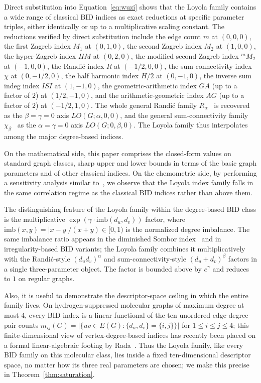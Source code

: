 \documentclass[a5paper, 10pt]{article}
\theoremstyle{plain}
\theoremstyle{remark}
\theoremstyle{definition}
\begin{document}
  Direct substitution into Equation~\eqref{eq:wuzi} shows that the
  Loyola family contains a wide range of classical BID indices as
  exact reductions at specific parameter triples, either
  identically or up to a multiplicative scaling constant. The reductions
  verified by direct substitution
  include the edge count $m$ at $(0, 0, 0)$, the first Zagreb
  index $M_1$ at $(0, 1, 0)$, the second Zagreb
  index $M_2$ at $(1, 0, 0)$, the hyper-Zagreb
  index $HM$ at $(0, 2, 0)$, the modified second Zagreb index
  ${}^{m}\!M_2$ at
  $(-1, 0, 0)$, the Randi\'c index $R$ at
  $(-1/2, 0, 0)$, the sum-connectivity index
  $\chi$ at $(0, -1/2, 0)$, the
  half harmonic index $H/2$ at
  $(0, -1, 0)$, the inverse sum indeg index
  $ISI$ at $(1, -1, 0)$, the
  geometric-arithmetic index
  $GA$ (up to a factor of $2$) at
  $(1/2, -1, 0)$, and the arithmetic-geometric index $AG$ (up to a
  factor of $2$) at $(-1/2, 1, 0)$. The whole general Randi\'c
  family $R_\alpha$~\cite{BollobasErdos1998} is recovered as the
  $\beta = \gamma = 0$ axis $LO(G; \alpha, 0, 0)$, and the general
  sum-connectivity family
  $\chi_\beta$~\cite{ZhouTrinajstic2009sumconn} as the
  $\alpha = \gamma = 0$ axis $LO(G; 0, \beta, 0)$. The Loyola family
  thus interpolates among the major degree-based indices.


  On the mathematical side, this paper comprises the
  closed-form values on standard graph classes, sharp upper and
  lower bounds in terms of the basic graph parameters and of other
  classical indices. On the
  chemometric side, by performing a sensitivity analysis  similar
  to~\cite{MovahediGutmanRedzepovicFurtula2026}, we observe that
   the Loyola index
  family  falls in the same correlation regime as the classical BID
  indices rather than above them.

  The distinguishing feature of the Loyola family within the
  degree-based BID class is the multiplicative
  $\exp(\gamma \cdot \mathrm{imb}(d_u, d_v))$ factor, where
  $\mathrm{imb}(x, y) = |x - y|/(x + y) \in [0, 1)$ is the
  normalized degree imbalance. The same imbalance ratio appears
  in the diminished Sombor
  index~\cite{MovahediGutmanRedzepovicFurtula2026} and in
  irregularity-based BID variants; the Loyola family combines it
  multiplicatively with the Randi\'c-style $(d_u d_v)^\alpha$ and
  sum-connectivity-style $(d_u + d_v)^\beta$ factors in a single
  three-parameter object. The factor is bounded above by
  $e^{\gamma}$ and reduces to $1$ on regular graphs.

  Also, it is useful to demonstrate the descriptor-space ceiling in
  which the entire family lives. On hydrogen-suppressed molecular
  graphs of maximum degree at most $4$, every BID index is a linear
  functional of the ten unordered edge-degree-pair counts
  $m_{ij}(G) = |\{uv \in E(G) : \{d_u, d_v\} = \{i, j\}\}|$ for
  $1 \le i \le j \le 4$; this finite-dimensional view of
  vertex-degree-based indices has recently been placed on a formal
  linear-algebraic footing by Rada~\cite{Rada2026LinearVDB}. Thus
  the Loyola family, like every BID family on this molecular class,
  lies inside a fixed ten-dimensional descriptor
  space, no matter how
  its three real parameters are chosen; we make this precise in
  Theorem~\ref{thm:saturation}.
\end{document}
